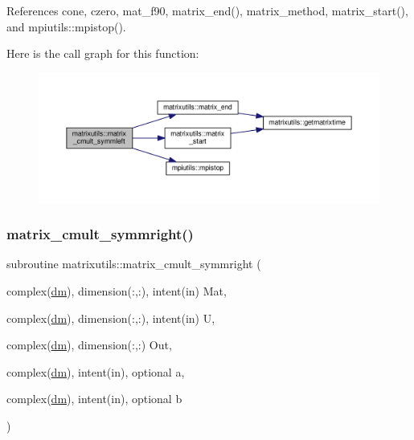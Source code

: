 References cone, czero, mat\+\_\+f90, matrix\+\_\+end(), matrix\+\_\+method, matrix\+\_\+start(), and mpiutils\+::mpistop().

Here is the call graph for this function\+:
\nopagebreak
\begin{figure}[H]
\begin{center}
\leavevmode
\includegraphics[width=350pt]{namespacematrixutils_a4389445ac98a45384153fff75a6a21af_cgraph}
\end{center}
\end{figure}
\mbox{\label{namespacematrixutils_a2098ca04f94da631caf2ebcce5ad7bf9}} 
\subsubsection{\texorpdfstring{matrix\+\_\+cmult\+\_\+symmright()}{matrix\_cmult\_symmright()}}
{\footnotesize\ttfamily subroutine matrixutils\+::matrix\+\_\+cmult\+\_\+symmright (\begin{DoxyParamCaption}\item[{complex(\mbox{\hyperlink{namespacematrixutils_a7bdc564986ea4d90f51201c75606ef3d}{dm}}), dimension(\+:,\+:), intent(in)}]{Mat,  }\item[{complex(\mbox{\hyperlink{namespacematrixutils_a7bdc564986ea4d90f51201c75606ef3d}{dm}}), dimension(\+:,\+:), intent(in)}]{U,  }\item[{complex(\mbox{\hyperlink{namespacematrixutils_a7bdc564986ea4d90f51201c75606ef3d}{dm}}), dimension(\+:,\+:)}]{Out,  }\item[{complex(\mbox{\hyperlink{namespacematrixutils_a7bdc564986ea4d90f51201c75606ef3d}{dm}}), intent(in), optional}]{a,  }\item[{complex(\mbox{\hyperlink{namespacematrixutils_a7bdc564986ea4d90f51201c75606ef3d}{dm}}), intent(in), optional}]{b }\end{DoxyParamCaption})}



